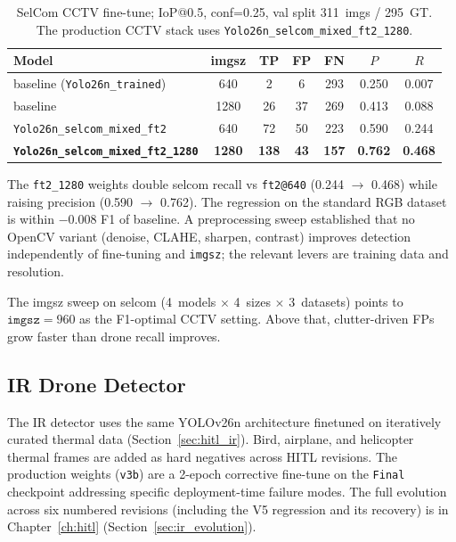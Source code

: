 \begin{table}[htbp]
    \centering
    \caption{SelCom CCTV fine-tune; IoP@0.5, conf=0.25, val split 311~imgs / 295~GT. The production CCTV stack uses \texttt{Yolo26n\_selcom\_mixed\_ft2\_1280}.}
    \label{tab:selcom}
    \begin{tabular}{lcccccc}
        \toprule
        Model & imgsz & TP & FP & FN & $P$ & $R$ \\
        \midrule
        baseline (\texttt{Yolo26n\_trained})        & 640  &   2 &  6 & 293 & 0.250 & 0.007 \\
        baseline                                    & 1280 &  26 & 37 & 269 & 0.413 & 0.088 \\
        \texttt{Yolo26n\_selcom\_mixed\_ft2}        & 640  &  72 & 50 & 223 & 0.590 & 0.244 \\
        \textbf{\texttt{Yolo26n\_selcom\_mixed\_ft2\_1280}} & \textbf{1280} & \textbf{138} & \textbf{43} & \textbf{157} & \textbf{0.762} & \textbf{0.468} \\
        \bottomrule
    \end{tabular}
\end{table}

The \texttt{ft2\_1280} weights double selcom recall vs \texttt{ft2@640} (0.244 $\to$ 0.468) while raising precision (0.590 $\to$ 0.762). The regression on the standard RGB dataset is within $-0.008$ F1 of baseline. A preprocessing sweep established that no OpenCV variant (denoise, CLAHE, sharpen, contrast) improves detection independently of fine-tuning and \texttt{imgsz}; the relevant levers are training data and resolution.

The imgsz sweep on selcom (4~models $\times$ 4~sizes $\times$ 3~datasets) points to $\mathtt{imgsz}=960$ as the F1-optimal CCTV setting. Above that, clutter-driven FPs grow faster than drone recall improves.

\subsection{IR Drone Detector}
\label{sec:ir_detector}

The IR detector uses the same YOLOv26n architecture finetuned on iteratively curated thermal data (Section~\ref{sec:hitl_ir}). Bird, airplane, and helicopter thermal frames are added as hard negatives across HITL revisions. The production weights (\texttt{v3b}) are a 2-epoch corrective fine-tune on the \texttt{Final} checkpoint addressing specific deployment-time failure modes. The full evolution across six numbered revisions (including the V5 regression and its recovery) is in Chapter~\ref{ch:hitl} (Section~\ref{sec:ir_evolution}).


